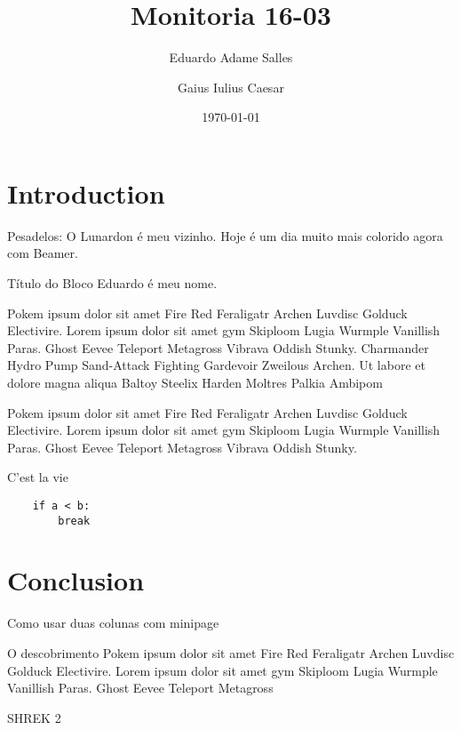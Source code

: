 \documentclass[aspectratio=169]{beamer}
\title{Monitoria 16-03}
\author[SALLES, E. \and CAESAR, G.]{Eduardo Adame Salles \and Gaius Iulius Caesar}
\date{\today}
\institute[EMAp/FGV]{Escola de Matemática Aplicada da Fundação Getulio Vargas}
\begin{document}
\maketitle

\begin{frame}
    \tableofcontents
\end{frame}

\section{Introduction}

\begin{frame}{Pesadelos: O Lunardon é meu vizinho.}
    Hoje é um dia muito mais colorido agora com Beamer.
    
    \begin{block}{Título do Bloco}
    Eduardo é meu nome.
    \end{block}
    
    \begin{multicols}{3}
    Pokem ipsum dolor sit amet Fire Red Feraligatr Archen Luvdisc Golduck Electivire. Lorem ipsum dolor sit amet gym Skiploom Lugia Wurmple Vanillish Paras. Ghost Eevee Teleport Metagross Vibrava Oddish Stunky. Charmander Hydro Pump Sand-Attack Fighting Gardevoir Zweilous Archen. Ut labore et dolore magna aliqua Baltoy Steelix Harden Moltres Palkia Ambipom
    \end{multicols}
    
    Pokem ipsum dolor sit amet Fire Red Feraligatr Archen Luvdisc Golduck Electivire. Lorem ipsum dolor sit amet gym Skiploom Lugia Wurmple Vanillish Paras. Ghost Eevee Teleport Metagross Vibrava Oddish Stunky. 
\end{frame}

\begin{frame}[fragile]{C'est la vie}
    \begin{verbatim}
    if a < b:
        break
    \end{verbatim}
\end{frame}

\section{Conclusion}

\begin{frame}{Como usar duas colunas com minipage}
\begin{minipage}{.45\textwidth}
    \begin{block}{O descobrimento}
    Pokem ipsum dolor sit amet Fire Red Feraligatr Archen Luvdisc Golduck Electivire. Lorem ipsum dolor sit amet gym Skiploom Lugia Wurmple Vanillish Paras. Ghost Eevee Teleport Metagross
    \end{block}
\end{minipage}
\hfill
\begin{minipage}{.45\textwidth}
    SHREK 2
\end{minipage}   
\end{frame}
\end{document}
